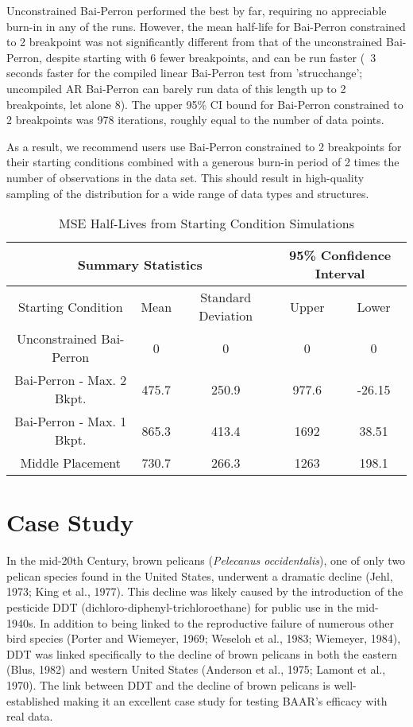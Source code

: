 \documentclass[submit]{smj}
\begin{document}
Unconstrained Bai-Perron performed the best by far, requiring no appreciable burn-in in any of the runs. However, the mean half-life for Bai-Perron constrained to 2 breakpoint was not significantly different from that of the unconstrained Bai-Perron, despite starting with 6 fewer breakpoints, and can be run faster (~3 seconds faster for the compiled linear Bai-Perron test from 'strucchange'; uncompiled AR Bai-Perron can barely run data of this length up to 2 breakpoints, let alone 8). The upper 95\% CI bound for Bai-Perron constrained to 2 breakpoints was 978 iterations, roughly equal to the number of data points.

As a result, we recommend users use Bai-Perron constrained to 2 breakpoints for their starting conditions combined with a generous burn-in period of 2 times the number of observations in the data set. This should result in high-quality sampling of the distribution for a wide range of data types and structures.

\begin{table}[ht]
\caption{MSE Half-Lives from Starting Condition Simulations}
\begin{center}
\begin{tabular}{| c | c | c || c | c |}
 \hline
 \multicolumn{3}{|c||}{\textbf{Summary Statistics}}  &  \multicolumn{2}{|c|}{\textbf{95\% Confidence Interval}}\\ 
 \hline
Starting Condition & Mean & Standard Deviation &  Upper & Lower \\  
 \hline
Unconstrained Bai-Perron & 0 & 0 &  0 & 0 \\
Bai-Perron - Max. 2 Bkpt. & 475.7 & 250.9 &  977.6 & -26.15 \\
Bai-Perron - Max. 1 Bkpt. & 865.3 & 413.4 & 1692 & 38.51 \\
Middle Placement & 730.7 & 266.3 & 1263 & 198.1 \\
 \hline
\end{tabular}
\end{center}
\label{Pelican Move Simulation Results}
\end{table}


\section{Case Study }
In the mid-20th Century, brown pelicans (\textit{Pelecanus occidentalis}), one of only two pelican species found in the United States, underwent a dramatic decline (Jehl, 1973; King et al., 1977). This decline was likely caused by the introduction of the pesticide DDT (dichloro-diphenyl-trichloroethane) for public use in the mid-1940s. In addition to
being linked to the reproductive failure of numerous other bird species (Porter and Wiemeyer, 1969; Weseloh et al., 1983; Wiemeyer, 1984), DDT was linked specifically to the decline of brown pelicans in both the eastern (Blus, 1982) and western United States (Anderson et al., 1975; Lamont et al., 1970). The link between DDT and the decline of brown pelicans is well-established making it an excellent case study for testing BAAR's efficacy with real data.
\end{document}
